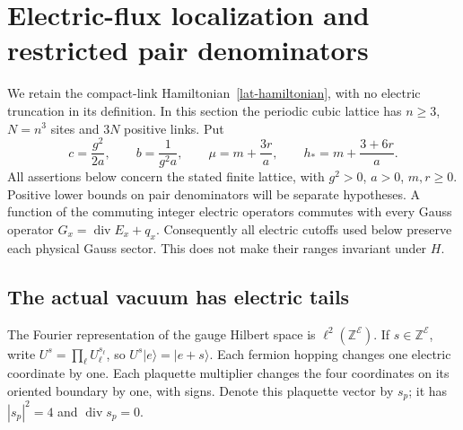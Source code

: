 \section{Electric-flux localization and restricted pair denominators}
\label{flux4-section}

We retain the compact-link Hamiltonian~\eqref{lat-hamiltonian},
with no electric truncation in its definition.  In this section
the periodic cubic lattice has $n\ge3$, $N=n^3$ sites and $3N$ positive
links.  Put
\begin{equation}
 c=\frac{g^2}{2a},\qquad b=\frac1{g^2a},\qquad
 \mu=m+\frac{3r}{a},\qquad
 h_*=m+\frac{3+6r}{a}.
 \label{flux4-constants}
\end{equation}
All assertions below concern the stated finite lattice, with $g^2>0$,
$a>0$, $m,r\ge0$.  Positive lower bounds on pair denominators will be
separate hypotheses.  A function of the commuting integer electric
operators commutes with every Gauss operator
$G_x=\operatorname{div}E_x+q_x$.  Consequently all electric cutoffs used
below preserve each physical Gauss sector.  This does not make their
ranges invariant under $H$.

\subsection{The actual vacuum has electric tails}

The Fourier representation of the gauge Hilbert space is
$\ell^2(\mathbb Z^{\mathcal E})$.  If $s\in\mathbb Z^{\mathcal E}$,
write $U^s=\prod_\ell U_\ell^{s_\ell}$, so
$U^s|e\rangle=|e+s\rangle$.  Each fermion hopping changes one electric
coordinate by one.  Each plaquette multiplier changes the four
coordinates on its oriented boundary by one, with signs.  Denote this
plaquette vector by $s_p$; it has $|s_p|^2=4$ and
$\operatorname{div}s_p=0$.

